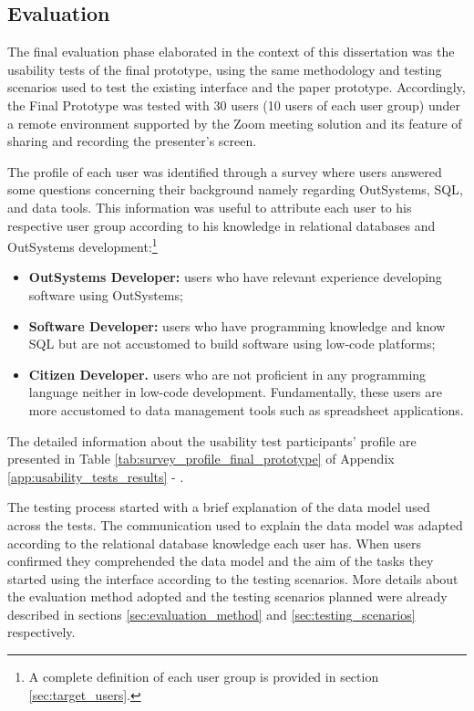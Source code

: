 \subsection{Evaluation}
\label{subsec:service_studio_evaluation}

The final evaluation phase elaborated in the context of this dissertation was the usability tests of the final prototype, using the same methodology and testing scenarios used to test the existing interface and the paper prototype. Accordingly, the Final Prototype was tested with 30 users (10 users of each user group) under a remote environment supported by the Zoom \cite{zoom} meeting solution and its feature of sharing and recording the presenter's screen.

The profile of each user was identified through a survey where users answered some questions concerning their background namely regarding OutSystems, \gls{SQL}, and data tools. This information was useful to attribute each user to his respective user group according to his knowledge in relational databases and OutSystems development:\footnote{A complete definition of each user group is provided in section \ref{sec:target_users}.}

\begin{itemize}
  \item \textbf{OutSystems Developer: }users who have relevant experience developing software using OutSystems;
  \item \textbf{Software Developer: }users who have programming knowledge and know \gls{SQL} but are not accustomed to build software using low-code platforms;
  \item \textbf{Citizen Developer. }users who are not proficient in any programming language neither in low-code development. Fundamentally, these users are more accustomed to data management tools such as spreadsheet applications.
\end{itemize}

The detailed information about the usability test participants' profile are presented in Table \ref{tab:survey_profile_final_prototype} of Appendix \ref{app:usability_tests_results} - .

The testing process started with a brief explanation of the data model used across the tests. The communication used to explain the data model was adapted according to the relational database knowledge each user has. When users confirmed they comprehended the data model and the aim of the tasks they started using the interface according to the testing scenarios. More details about the evaluation method adopted and the testing scenarios planned were already described in sections \ref{sec:evaluation_method} and \ref{sec:testing_scenarios} respectively.

